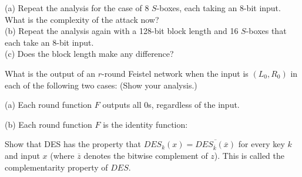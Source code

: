 \documentclass[12pt,letterpaper,boxed]{amspset}
\begin{document}
\begin{solution}
(a) Repeat the analysis for the case of 8 $S$-boxes, each taking an 8-bit input. What is the complexity of the attack now?\\

\vspace{4cm}
\noindent (b) Repeat the analysis again with a 128-bit block length and 16 $S$-boxes that each take an 8-bit input.\\

\vspace{4cm}
\noindent (c) Does the block length make any difference?\\

\vspace{1cm}
\end{solution}

\begin{problem}[5.2]
What is the output of an $r$-round Feistel network when the input is $(L_0, R_0)$ in each of the following two cases: (Show your analysis.)
\end{problem}

\begin{solution}
(a) Each round function $F$ outputs all $0$s, regardless of the input.

\vspace{7cm}
\noindent (b) Each round function $F$ is the identity function:

\vspace{5cm}
\end{solution}

\begin{problem}[5.3]
Show that DES has the property that $DES_k(x) = \overline{DES_{\overline{k}}(\overline{x})}$ for every key $k$ and input $x$ (where $\overline{z}$ denotes the bitwise complement of $z$). This is called the complementarity property of $DES$.
\end{problem}

\begin{solution}
\vspace{4cm}
\end{solution}


\end{document}
